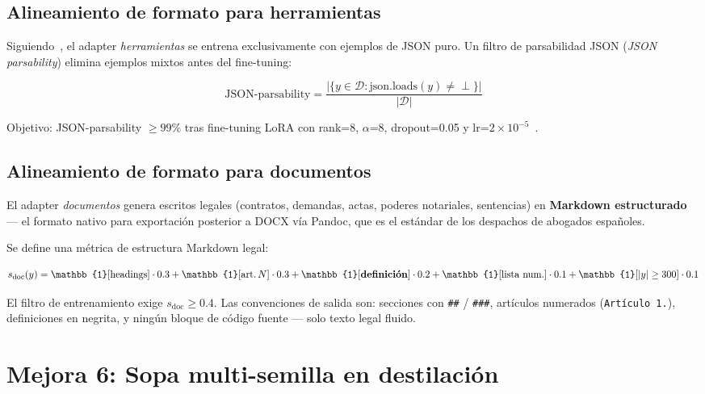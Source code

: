 \documentclass[11pt,a4paper]{article}
\begin{document}
\subsection{Alineamiento de formato para herramientas}

Siguiendo~\citet{belcak2025small}, el adapter \textit{herramientas} se entrena
exclusivamente con ejemplos de JSON puro. Un filtro de parsabilidad JSON
(\textit{JSON parsability}) elimina ejemplos mixtos antes del fine-tuning:

\begin{equation}
  \text{JSON-parsability} = \frac{|\{y \in \mathcal{D} : \text{json.loads}(y) \neq \perp\}|}{|\mathcal{D}|}
\end{equation}

Objetivo: JSON-parsability $\geq 99\%$ tras fine-tuning LoRA con rank=8, $\alpha$=8,
dropout=0.05 y lr=$2\times10^{-5}$~\citep{salesforce2025xlam}.

\subsection{Alineamiento de formato para documentos}

El adapter \textit{documentos} genera escritos legales (contratos, demandas, actas,
poderes notariales, sentencias) en \textbf{Markdown estructurado} — el formato
nativo para exportación posterior a DOCX vía Pandoc, que es el estándar de los
despachos de abogados españoles.

Se define una métrica de estructura Markdown legal:

\begin{equation}
  s_{\text{doc}}(y) = \mathbb{1}[\text{headings}] \cdot 0.3
  + \mathbb{1}[\text{art.\,}N] \cdot 0.3
  + \mathbb{1}[\textbf{definición}] \cdot 0.2
  + \mathbb{1}[\text{lista num.}] \cdot 0.1
  + \mathbb{1}[|y| \geq 300] \cdot 0.1
\end{equation}

El filtro de entrenamiento exige $s_{\text{doc}} \geq 0.4$. Las convenciones de salida son:
secciones con \texttt{\#\#} / \texttt{\#\#\#}, artículos numerados (\texttt{Artículo 1.}),
definiciones en negrita, y ningún bloque de código fuente — solo texto legal fluido.

\section{Mejora 6: Sopa multi-semilla en destilación}
\label{sec:soup}
\end{document}
